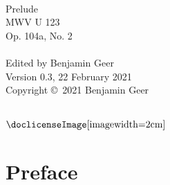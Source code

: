 \documentclass[a4paper, 12pt]{book}
\begin{document}
\frontmatter


\begin{titlepage}
\begin{center}
   \\
  \vspace{2cm}
  {\fontsize{32}{42}\selectfont Prelude} \\
  \vspace{2 cm}
  {\fontsize{24}{34}\selectfont MWV U 123} \\
  \vspace{0.5 cm}
  {\fontsize{24}{34}\selectfont Op. 104a, No. 2} \\
  \vspace{4 cm}
  {\Large {}} \\
  \vspace{0.5 cm}
  {\Large Edited by Benjamin Geer} \\
  \vspace{4.75 cm}
  {\footnotesize Version 0.3, 22 February 2021} \\
  \vspace{0.1 cm}
  {\footnotesize Copyright \copyright\ 2021 Benjamin Geer \\ \doclicenseText} \\
  \vspace{0.25 cm}
  \begin{minipage}{\textwidth}
  \centering
  $\vcenter{\hbox{\doclicenseImage[imagewidth=2cm]}}$
  \end{minipage}
  \end{center}
\end{titlepage}


\chapter*{Preface}
\end{document}
